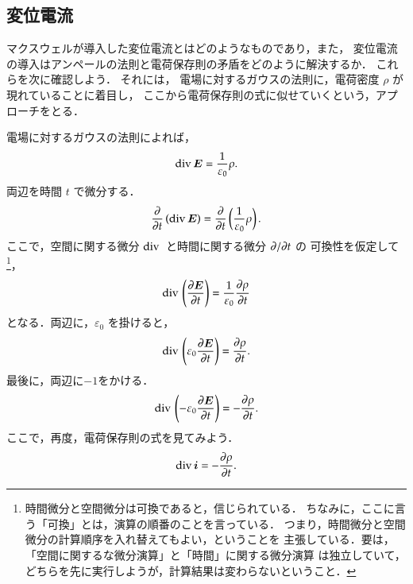     \subsection{変位電流}
        マクスウェルが導入した変位電流とはどのようなものであり，また，
        変位電流の導入はアンペールの法則と電荷保存則の矛盾をどのように解決するか．
        これらを次に確認しよう．
        それには，
        電場に対するガウスの法則に，電荷密度 $\rho$ が現れていることに着目し，
        ここから電荷保存則の式に似せていくという，アプローチをとる．

        電場に対するガウスの法則によれば，
            \begin{align*}
                \mathrm{div}\, \boldsymbol{E} = \frac{1}{\varepsilon_{0}}\rho.
            \end{align*}
        両辺を時間 $t$ で微分する．
            \begin{align*}
                  \frac{\partial}{\partial t}\left(\mathrm{div}\, \boldsymbol{E} \right)
                = \frac{\partial }{\partial t}\left(\frac{1}{\varepsilon_{0}}\rho\right).
            \end{align*}
        ここで，空間に関する微分 $\mathrm{div}\,$ と時間に関する微分 $\partial/\partial t$ の
        可換性を仮定して
            \footnote{
                時間微分と空間微分は可換であると，信じられている．
                ちなみに，ここに言う「可換」とは，演算の順番のことを言っている．
                つまり，時間微分と空間微分の計算順序を入れ替えてもよい，ということを
                主張している．要は，「空間に関するな微分演算」と「時間」に関する微分演算
                は独立していて，どちらを先に実行しようが，計算結果は変わらないということ．
            }，
            \begin{equation*}
                  \mathrm{div}\, \left(\frac{\partial \boldsymbol{E}}{\partial t} \right)
                = \frac{1}{\varepsilon_{0}}\frac{\partial \rho}{\partial t}
            \end{equation*}
        となる．両辺に，$\varepsilon_{0}$ を掛けると，
            \begin{equation*}
                  \mathrm{div}\, \left(\varepsilon_{0}\frac{\partial \boldsymbol{E}}{\partial t} \right)
                = \frac{\partial \rho}{\partial t}.
            \end{equation*}
        最後に，両辺に$-1$をかける．
            \begin{equation*}
                  \mathrm{div}\, \left( - \varepsilon_{0}\frac{\partial \boldsymbol{E}}{\partial t} \right)
                = - \frac{\partial \rho}{\partial t}.
            \end{equation*}
        ここで，再度，電荷保存則の式を見てみよう．
            \begin{equation*}
                \mathrm{div}\, \boldsymbol{i} = -\frac{\partial \rho}{\partial t}.
            \end{equation*}

